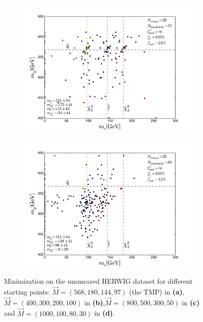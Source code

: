\documentclass[twoside,english]{uiofysmaster}
\begin{document}
\begin{figure}[hbt]
	\begin{subfigure}[b]{0.45\textwidth}
		\includegraphics[width=\textwidth]{figures/webber_rec_table/webber-rec_wrong_starting_point-800-500-300-50_lowtol.pdf} 
		\caption{ }
	\end{subfigure}
	\begin{subfigure}[b]{0.45\textwidth}
		\includegraphics[width=\textwidth]{figures/webber_rec_table/webber-rec_wrong_starting_point-1000-100-80-30_lowtol.pdf}
		\caption{ } 
	\end{subfigure}
	\caption{Minimization on the unsmeared {\scshape HERWIG} dataset for different starting points: $\vec M = (568, 180, 144, 97)$ (the TMP) in {\bf (a)}, $\vec M = (400, 300, 200, 100)$  in {\bf (b)},$\vec M = (800, 500, 300, 50)$ in {\bf (c)} and $\vec M = (1000, 100, 80, 30)$ in {\bf (d)}.}
	\label{fig:starting_point_sensitivity_combinatorics}
\end{figure}
\end{document}

